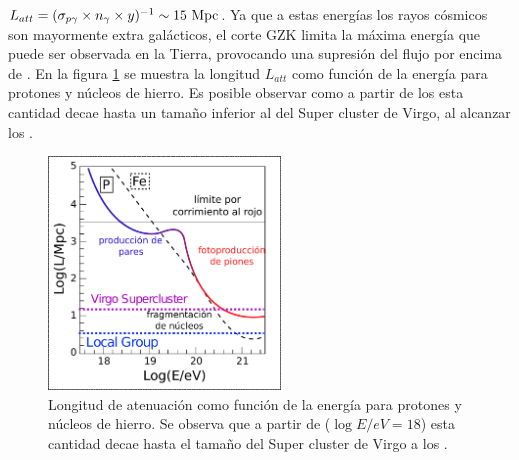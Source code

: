 $L_{att}=(\sigma_{p\gamma}\times n_{\gamma}\times y)^{-1}\sim 15\mbox{ }{\rm Mpc}$. 
Ya que a estas energ\'ias los rayos c\'osmicos son mayormente extra gal\'acticos, el corte GZK limita la m\'axima energ\'ia que puede ser observada en la Tierra, provocando una supresi\'on del flujo por encima de .
En la figura \ref{fig:protProp} se muestra la longitud $L_{att}$ como funci\'on de la energ\'ia para protones y n\'ucleos de hierro. 
Es posible observar como a partir de los  esta cantidad decae hasta un tama\~no inferior al del Super cluster de Virgo, al alcanzar los .
%
\begin{figure}[ht]
	\begin{center}
	\includegraphics[width=0.55\textwidth]{fig/introduccion/proton_propaga_espanol}
	\caption{\label{fig:protProp} Longitud de atenuaci\'on como funci\'on de la energ\'ia para protones y n\'ucleos de hierro. Se observa que a partir de  ($\log{E/eV}=18$) esta cantidad decae hasta el tama\~no del Super cluster de Virgo a los .}
	\end{center}
\end{figure}
%

